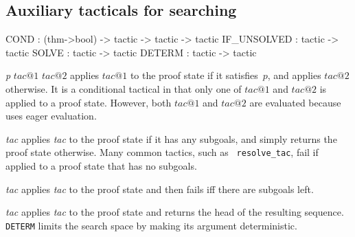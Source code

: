\subsection{Auxiliary tacticals for searching}
\begin{ttbox} 
COND        : (thm->bool) -> tactic -> tactic -> tactic
IF_UNSOLVED : tactic -> tactic
SOLVE       : tactic -> tactic
DETERM      : tactic -> tactic
\end{ttbox}
\begin{ttdescription}
\item[\ttindexbold{COND} {\it p} $tac@1$ $tac@2$] 
applies $tac@1$ to the proof state if it satisfies~$p$, and applies $tac@2$
otherwise.  It is a conditional tactical in that only one of $tac@1$ and
$tac@2$ is applied to a proof state.  However, both $tac@1$ and $tac@2$ are
evaluated because \ML{} uses eager evaluation.

\item[\ttindexbold{IF_UNSOLVED} {\it tac}] 
applies {\it tac\/} to the proof state if it has any subgoals, and simply
returns the proof state otherwise.  Many common tactics, such as {\tt
resolve_tac}, fail if applied to a proof state that has no subgoals.

\item[\ttindexbold{SOLVE} {\it tac}] 
applies {\it tac\/} to the proof state and then fails iff there are subgoals
left.

\item[\ttindexbold{DETERM} {\it tac}] 
applies {\it tac\/} to the proof state and returns the head of the
resulting sequence.  {\tt DETERM} limits the search space by making its
argument deterministic.
\end{ttdescription}


